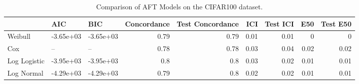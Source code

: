 \begin{table*}
\centering
\caption{Comparison of AFT Models on the CIFAR100 dataset.}
\label{tab:cifar100}
\begin{tabular}{lllrrrrrr}
\toprule
 & AIC & BIC & Concordance & Test Concordance & ICI & Test ICI & E50 & Test E50 \\
\midrule
Weibull & -3.65e+03 & -3.65e+03 & 0.79 & 0.79 & 0.01 & 0.01 & 0 & 0 \\
Cox & -- & -- & 0.78 & 0.78 & 0.03 & 0.04 & 0.02 & 0.02 \\
Log Logistic & -3.95e+03 & -3.95e+03 & 0.8 & 0.8 & 0.03 & 0.02 & 0.01 & 0.01 \\
Log Normal & -4.29e+03 & -4.29e+03 & 0.79 & 0.8 & 0.02 & 0.02 & 0.01 & 0.01 \\
\bottomrule
\end{tabular}
\end{table*}
